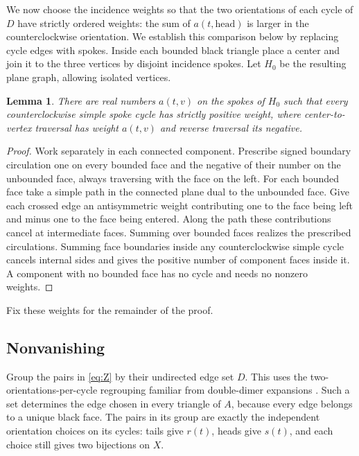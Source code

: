 \documentclass[11pt]{article}
\newtheorem{lemma}[theorem]{Lemma}
\theoremstyle{remark}
\numberwithin{equation}{section}
\begin{document}
We now choose the incidence weights so that the two orientations of each
cycle of \(D\) have strictly ordered weights: the sum of
\(a(t,\mathrm{head})\) is larger in the counterclockwise orientation.
We establish this comparison below by replacing cycle edges with spokes.
Inside each bounded black triangle place a center and join
it to the three vertices by disjoint incidence spokes.
Let \(H_0\) be the resulting plane graph, allowing isolated
vertices.

\begin{lemma}\label{lem:circulation}
There are real numbers \(a(t,v)\) on the spokes of \(H_0\)
such that every counterclockwise simple spoke cycle has
strictly positive weight, where center-to-vertex traversal
has weight \(a(t,v)\) and reverse traversal its negative.
\end{lemma}

\begin{proof}
Work separately in each connected component. Prescribe
signed boundary circulation one on every bounded face and
the negative of their number on the unbounded face, always
traversing with the face on the left. For each bounded face
take a simple path in the connected plane dual to the
unbounded face. Give each crossed edge an antisymmetric
weight contributing one to the face being left and minus
one to the face being entered. Along the path these
contributions cancel at intermediate faces. Summing over
bounded faces realizes the prescribed circulations.
Summing face boundaries inside any counterclockwise simple
cycle cancels internal sides and gives the positive number
of component faces inside it. A component with no bounded
face has no cycle and needs no nonzero weights.
\end{proof}

Fix these weights for the remainder of the proof.

\subsection{Nonvanishing}

Group the pairs in \eqref{eq:Z} by their undirected edge
set \(D\). This uses the two-orientations-per-cycle regrouping
familiar from double-dimer expansions
\cite[Section~3.2.1, Lemma~1]{Kenyon2014}. Such a set determines the edge chosen in every
triangle of \(A\), because every edge belongs to a unique
black face. The pairs in its group are exactly the
independent orientation choices on its cycles: tails
give \(r(t)\), heads give \(s(t)\), and each choice
still gives two bijections on \(X\).
\end{document}
